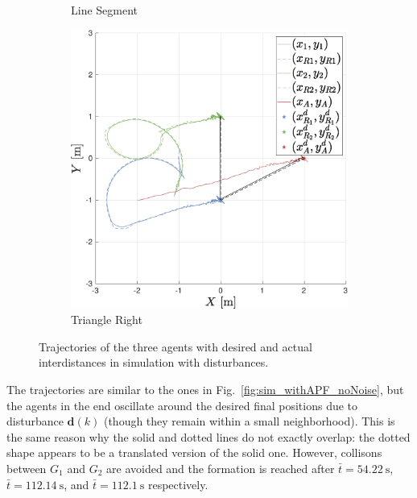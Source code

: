 \documentclass{ifacconf}
\begin{document}
\begin{figure}
\begin{subfigure}[b]{0.32\columnwidth}
        \caption{Line Segment}
    \end{subfigure}
    \begin{subfigure}[b]{0.32\columnwidth}
        \centering
        \includegraphics[width=\linewidth]{images/simulations/with_APF/noisy/3rd_scenario_with_noisy.eps}
      \caption{Triangle Right}
    \end{subfigure}
    \vspace{-0.2cm}
    \caption{Trajectories of the three agents with desired and actual interdistances in simulation with disturbances.}
    \label{fig:sim_withAPF_noisy}
\end{figure}
The trajectories are similar to the ones in Fig.~\ref{fig:sim_withAPF_noNoise},
but the agents in the end oscillate around the desired final positions due to disturbance $\boldsymbol{d}(k)$
(though they remain within a small neighborhood).
This is the same reason why the solid and dotted lines do not exactly overlap:
the dotted shape appears to be a translated version of the solid one.
However, collisons between $G_1$ and $G_2$ are avoided and the formation is reached after
$\bar{t} = \SI{54.22}{\second}$, $\bar{t} = \SI{112.14}{\second}$, and 
$\bar{t} = \SI{112.1}{\second}$ respectively.
\end{document}
